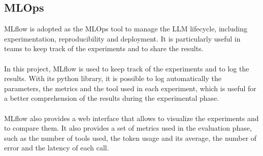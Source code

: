 \documentclass[12pt,a4paper,openright,twoside]{book}
\begin{document}
\subsection{MLOps}
MLflow is adopted as the MLOps tool to manage the LLM lifecycle, including experimentation, reproducibility and deployment. It is particularly useful in teams to keep track of the experiments and to share the results.
\\\\
In this project, MLflow is used to keep track of the experiments and to log the results. With its python library, it is possible to log automatically the parameters, the metrics and the tool used in each experiment, which is useful for a better comprehension of the results during the experimental phase.
\\\\
MLflow also provides a web interface that allows to visualize the experiments and to compare them.
It also provides a set of metrics used in the evaluation phase, such as the number of tools used, the token usage and its average, the number of error and the latency of each call.  
\end{document}
